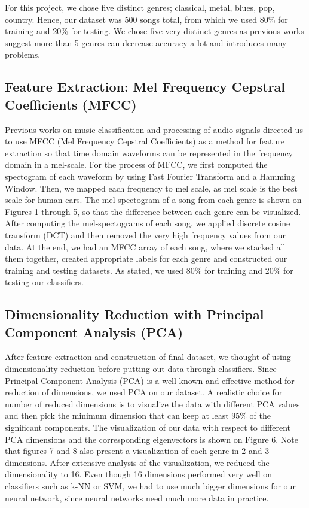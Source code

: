 For this project, we chose five distinct genres; classical, metal, blues, pop, country. Hence, our dataset was 500 songs total, from which we used 80\% for training and 20\% for testing. We chose five very distinct genres as previous works \cite{Chun:2010} suggest more than 5 genres can decrease accuracy a lot and introduces many problems. 

\subsection{Feature Extraction: Mel Frequency Cepstral Coefficients (MFCC)}
Previous works \cite{MFCC:2011} on music classification and processing of audio signals directed us to use MFCC (Mel Frequency Cepstral Coefficients) as a method for feature extraction so that time domain waveforms can be represented in the frequency domain in a mel-scale. For the process of MFCC, we first computed the spectogram of each waveform by using Fast Fourier Transform and a Hamming Window. Then, we mapped each frequency to mel scale, as mel scale is the best scale for human ears. The mel spectogram of a song from each genre is shown on Figures 1 through 5, so that the difference between each genre can be visualized. After computing the mel-spectograms of each song, we applied discrete cosine transform (DCT) and then removed the very high frequency values from our data. At the end, we had an MFCC array of each song, where we stacked all them together, created appropriate labels for each genre and constructed our training and testing datasets. As stated, we used 80\% for training and 20\% for testing our classifiers. 


\subsection{Dimensionality Reduction with Principal Component Analysis (PCA)}
After feature extraction and construction of final dataset, we thought of using dimensionality reduction before putting out data through classifiers. Since Principal Component Analysis (PCA) is a well-known and effective method for reduction of dimensions, we used PCA on our dataset. A realistic choice for number of reduced dimensions is to visualize the data with different PCA values and then pick the minimum dimension that can keep at least 95\% of the significant components. The visualization of our data with respect to different PCA dimensions and the corresponding eigenvectors is shown on Figure 6. Note that figures 7 and 8 also present a visualization of each genre in 2 and 3 dimensions. After extensive analysis of the visualization, we reduced the dimensionality to 16. Even though 16 dimensions performed very well on classifiers such as k-NN or SVM, we had to use much bigger dimensions for our neural network, since neural networks need much more data in practice. 

